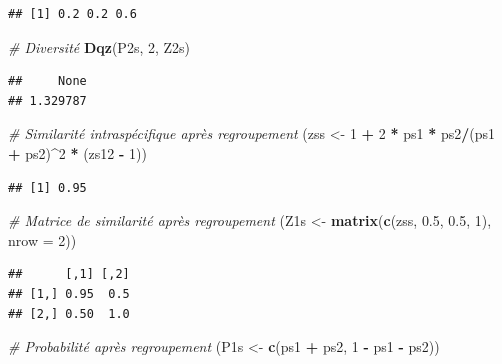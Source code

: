\documentclass[
  11pt,
  french,
  a4paper,
  extrafontsizes,onecolumn,openright
  ]{memoir}
\newenvironment{Shaded}{\begin{snugshade}}{\end{snugshade}}
\newcommand{\CommentTok}[1]{\textcolor[rgb]{0.56,0.35,0.01}{\textit{#1}}}
\newcommand{\DataTypeTok}[1]{\textcolor[rgb]{0.13,0.29,0.53}{#1}}
\newcommand{\DecValTok}[1]{\textcolor[rgb]{0.00,0.00,0.81}{#1}}
\newcommand{\FloatTok}[1]{\textcolor[rgb]{0.00,0.00,0.81}{#1}}
\newcommand{\KeywordTok}[1]{\textcolor[rgb]{0.13,0.29,0.53}{\textbf{#1}}}
\newcommand{\NormalTok}[1]{#1}
\newcommand{\OperatorTok}[1]{\textcolor[rgb]{0.81,0.36,0.00}{\textbf{#1}}}
\newcommand{\StringTok}[1]{\textcolor[rgb]{0.31,0.60,0.02}{#1}}
\begin{document}
\begin{verbatim}
## [1] 0.2 0.2 0.6
\end{verbatim}

\begin{Shaded}
\begin{Highlighting}[]
\CommentTok{# Diversité}
\KeywordTok{Dqz}\NormalTok{(P2s, }\DecValTok{2}\NormalTok{, Z2s)}
\end{Highlighting}
\end{Shaded}

\begin{verbatim}
##     None 
## 1.329787
\end{verbatim}

\begin{Shaded}
\begin{Highlighting}[]
\CommentTok{# Similarité intraspécifique après regroupement}
\NormalTok{(zss <-}\StringTok{ }\DecValTok{1} \OperatorTok{+}\StringTok{ }\DecValTok{2} \OperatorTok{*}\StringTok{ }\NormalTok{ps1 }\OperatorTok{*}\StringTok{ }\NormalTok{ps2}\OperatorTok{/}\NormalTok{(ps1 }\OperatorTok{+}\StringTok{ }\NormalTok{ps2)}\OperatorTok{^}\DecValTok{2} \OperatorTok{*}\StringTok{ }\NormalTok{(zs12 }\OperatorTok{-}\StringTok{ }\DecValTok{1}\NormalTok{))}
\end{Highlighting}
\end{Shaded}

\begin{verbatim}
## [1] 0.95
\end{verbatim}

\begin{Shaded}
\begin{Highlighting}[]
\CommentTok{# Matrice de similarité après regroupement}
\NormalTok{(Z1s <-}\StringTok{ }\KeywordTok{matrix}\NormalTok{(}\KeywordTok{c}\NormalTok{(zss, }\FloatTok{0.5}\NormalTok{, }\FloatTok{0.5}\NormalTok{, }\DecValTok{1}\NormalTok{), }\DataTypeTok{nrow =} \DecValTok{2}\NormalTok{))}
\end{Highlighting}
\end{Shaded}

\begin{verbatim}
##      [,1] [,2]
## [1,] 0.95  0.5
## [2,] 0.50  1.0
\end{verbatim}

\begin{Shaded}
\begin{Highlighting}[]
\CommentTok{# Probabilité après regroupement}
\NormalTok{(P1s <-}\StringTok{ }\KeywordTok{c}\NormalTok{(ps1 }\OperatorTok{+}\StringTok{ }\NormalTok{ps2, }\DecValTok{1} \OperatorTok{-}\StringTok{ }\NormalTok{ps1 }\OperatorTok{-}\StringTok{ }\NormalTok{ps2))}
\end{Highlighting}
\end{Shaded}
\end{document}
